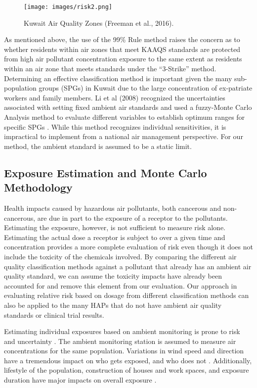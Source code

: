 %  
\begin{figure}
\texttt{[image: images/risk2.png]} 
\caption{Kuwait Air Quality Zones (Freeman et al., 2016).}
\label{fig2:aqzkuwait}
\end{figure}

As mentioned above, the use of the 99\% Rule method raises the concern as to whether residents within air zones that meet KAAQS standards are protected from high air pollutant concentration exposure to the same extent as residents within an air zone that meets standards under the ``3-Strike” method. Determining an effective classification method is important given the many sub-population groups (SPGs) in Kuwait due to the large concentration of ex-patriate workers and family members. Li et al (2008) recognized the uncertainties associated with setting fixed ambient air standards and used a fuzzy-Monte Carlo Analysis method to evaluate different variables to establish optimum ranges for specific SPGs \citep{Li2008}. While this method recognizes individual sensitivities, it is impractical to implement from a national air management perspective. For our method, the ambient standard is assumed to be a static limit.

\subsection{Exposure Estimation and Monte Carlo Methodology}

Health impacts caused by hazardous air pollutants, both cancerous and non-cancerous, are due in part to the exposure of a receptor to the pollutants. Estimating the exposure, however, is not sufficient to measure risk alone. Estimating the actual dose a receptor is subject to over a given time and concentration provides a more complete evaluation of risk even though it does not include the toxicity of the chemicals involved. By comparing the different air quality classification methods against a pollutant that already has an ambient air quality standard, we can assume the toxicity impacts have already been accounted for and remove this element from our evaluation. Our approach in evaluating relative risk based on dosage from different classification methods can also be applied to the many HAPs that do not have ambient air quality standards or clinical trial results.

Estimating individual exposures based on ambient monitoring is prone to risk and uncertainty \citep{Pernigotti2013, Thunis2013}.  The ambient monitoring station is assumed to measure air concentrations for the same population.  Variations in wind speed and direction have a tremendous impact on who gets exposed, and who does not \citep{Pratt2012}. Additionally, lifestyle of the population, construction of houses and work spaces, and exposure duration have major impacts on overall exposure \citep{Bell2006}.

